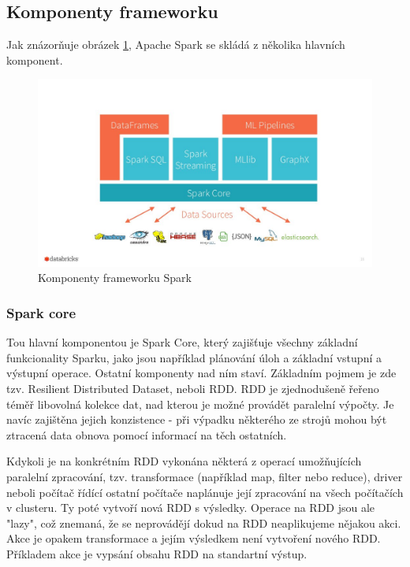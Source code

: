 \documentclass[thesis=B,czech]{FITthesis}[2012/06/26]
\begin{document}
\subsection{Komponenty frameworku}
	Jak znázorňuje obrázek \ref{fig:spark_components}, Apache Spark se skládá z několika hlavních komponent. 
	\begin{figure}[ht]
    	\centering
    	\includegraphics[width=1\textwidth]{images/spark_engine.jpg}
    	\caption{Komponenty frameworku Spark\cite{spark-components}}
    	\label{fig:spark_components}
	\end{figure}
	
\subsubsection{Spark core}
\label{spark-core}
	Tou hlavní komponentou je Spark Core, který zajišťuje všechny základní funkcionality Sparku, jako jsou například plánování úloh a základní vstupní a výstupní operace. Ostatní komponenty nad ním staví. Základním pojmem je zde tzv. Resilient Distributed Dataset, neboli RDD. RDD je zjednodušeně řeřeno téměř libovolná kolekce dat, nad kterou je možné provádět paralelní výpočty. Je navíc zajištěna jejich konzistence - při výpadku některého ze strojů mohou být ztracená data obnova pomocí informací na těch ostatních. 
	
	Kdykoli je na konkrétním RDD vykonána některá z operací umožňujících paralelní zpracování, tzv. transformace (například map, filter nebo reduce), driver neboli počítač řídící ostatní počítače naplánuje její zpracování na všech počítačích v clusteru. Ty poté vytvoří nová RDD s výsledky. Operace na RDD jsou ale "lazy", což znemaná, že se neprovádějí dokud na RDD neaplikujeme nějakou akci. Akce je opakem transformace a jejím výsledkem není vytvoření nového RDD. Příkladem akce je vypsání obsahu RDD na standartní výstup. 
\end{document}

